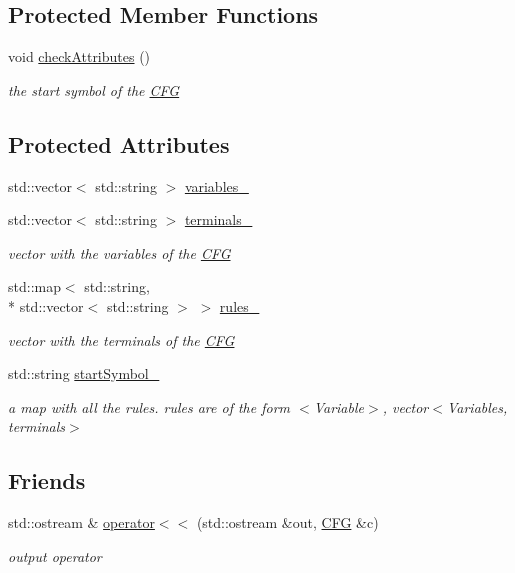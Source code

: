 \subsection*{Protected Member Functions}
\begin{DoxyCompactItemize}
\item 
void \hyperlink{classCFG_a20c962c9056a1770d71f9610df8db905}{check\-Attributes} ()
\begin{DoxyCompactList}\small\item\em the start symbol of the \hyperlink{classCFG}{C\-F\-G} \end{DoxyCompactList}\end{DoxyCompactItemize}
\subsection*{Protected Attributes}
\begin{DoxyCompactItemize}
\item 
std\-::vector$<$ std\-::string $>$ \hyperlink{classCFG_a7369373d17b20520d7b72d43f471cda9}{variables\-\_\-}
\item 
std\-::vector$<$ std\-::string $>$ \hyperlink{classCFG_ac105b578d6237fc6ff28e54c98bbb1b8}{terminals\-\_\-}
\begin{DoxyCompactList}\small\item\em vector with the variables of the \hyperlink{classCFG}{C\-F\-G} \end{DoxyCompactList}\item 
std\-::map$<$ std\-::string, \\*
std\-::vector$<$ std\-::string $>$ $>$ \hyperlink{classCFG_a6f148c60599eec412d168d2353b7b814}{rules\-\_\-}
\begin{DoxyCompactList}\small\item\em vector with the terminals of the \hyperlink{classCFG}{C\-F\-G} \end{DoxyCompactList}\item 
std\-::string \hyperlink{classCFG_a21527e2ffbb0b5bf8995ebae725858eb}{start\-Symbol\-\_\-}
\begin{DoxyCompactList}\small\item\em a map with all the rules. rules are of the form $<$\-Variable$>$, vector$<$\-Variables, terminals$>$ \end{DoxyCompactList}\end{DoxyCompactItemize}
\subsection*{Friends}
\begin{DoxyCompactItemize}
\item 
std\-::ostream \& \hyperlink{classCFG_a125cf827399aa731591064e741ab8fb7}{operator$<$$<$} (std\-::ostream \&out, \hyperlink{classCFG}{C\-F\-G} \&c)
\begin{DoxyCompactList}\small\item\em output operator \end{DoxyCompactList}\end{DoxyCompactItemize}


